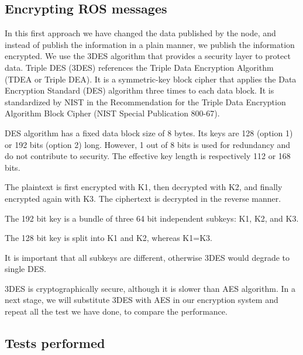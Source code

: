 \documentclass[journal,twoside]{JoPhA}
\begin{document}

\subsection{Encrypting ROS messages}



In this first approach we have changed the data published by the node, and instead of publish the information in a plain manner, we publish the information encrypted. We use the 3DES algorithm that provides a security layer to protect data.
Triple DES (3DES) references the Triple Data Encryption Algorithm (TDEA or Triple DEA). It is a symmetric-key block cipher that applies the Data Encryption Standard (DES) algorithm three times to each data block. It is standardized by NIST in the Recommendation for the Triple Data Encryption Algorithm Block Cipher (NIST Special Publication 800-67).

DES algorithm has a fixed data block size of 8 bytes. Its keys are 128 (option 1) or 192 bits (option 2) long. However, 1 out of 8 bits is used for redundancy and do not contribute to security. The effective key length is respectively 112 or 168 bits.

The plaintext is first encrypted with K1, then decrypted with K2, and finally encrypted again with K3. The ciphertext is decrypted in the reverse manner.

The 192 bit key is a bundle of three 64 bit independent subkeys: K1, K2, and K3.

The 128 bit key is split into K1 and K2, whereas K1=K3.

It is important that all subkeys are different, otherwise 3DES would degrade to single DES.

3DES is cryptographically secure, although it is slower than AES algorithm. In a next stage, we will substitute 3DES with AES in our encryption system and repeat all the test we have done, to compare the performance.


\subsection{Tests performed}
\end{document}
